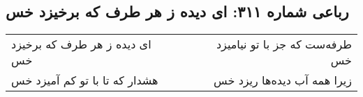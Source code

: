 \begin{center}
\section*{رباعی شماره ۳۱۱: ای دیده ز هر طرف که برخیزد خس}
\label{sec:sh311}
\begin{longtable}{l p{0.5cm} r}
ای دیده ز هر طرف که برخیزد خس
&&
طرفه‌ست که جز با تو نیامیزد خس
\\
هشدار که تا با تو کم آمیزد خس
&&
زیرا همه آب دیده‌ها ریزد خس
\\
\end{longtable}
\end{center}
